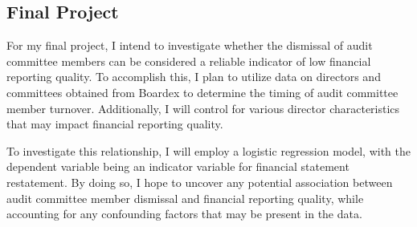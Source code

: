 \documentclass{article}
\begin{document}
\subsection*{Final Project}
For my final project, I intend to investigate whether the dismissal of audit committee members can be considered a reliable indicator of low financial reporting quality. To accomplish this, I plan to utilize data on directors and committees obtained from Boardex to determine the timing of audit committee member turnover. Additionally, I will control for various director characteristics that may impact financial reporting quality.

To investigate this relationship, I will employ a logistic regression model, with the dependent variable being an indicator variable for financial statement restatement. By doing so, I hope to uncover any potential association between audit committee member dismissal and financial reporting quality, while accounting for any confounding factors that may be present in the data. 
\end{document}
